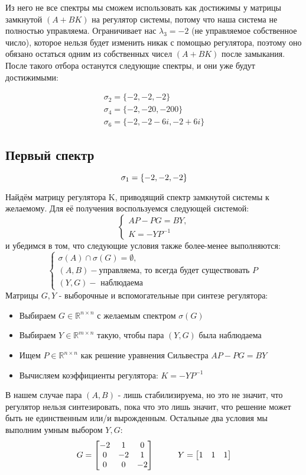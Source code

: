 Из него не все спектры мы сможем использовать как достижимы у матрицы замкнутой $(A+BK)$ на регулятор системы, потому что наша система не полностью управляема.
Ограничивает нас $\lambda_3=-2$ (не управляемое собственное число), которое нельзя будет изменить никак с помощью регулятора, поэтому оно обязано остаться одним из собственных чисел $(A+BK)$ после замыкания.
После такого отбора останутся следующие спектры, и они уже будут достижимыми:

$$
  \begin{aligned}
    \sigma_2 = \{-2, -2, -2\} \\
    \sigma_4 = \{-2, -20, -200\} \\
    \sigma_6 = \{-2, -2-6i, -2+6i\} 
  \end{aligned}
$$

\subsection{Первый спектр}
$$
    \sigma_1 = \{-2, -2, -2\} \\
$$

Найдём матрицу регулятора K, приводящий спектр замкнутой системы к желаемому. Для её получения воспользуемся следующей системой:
$$
\begin{cases}
  AP - PG = BY, \\
  K = -YP^{-1}
\end{cases}
$$ и убедимся в том, что следующие условия также более-менее выполняются:
$$
  \begin{cases}
    \sigma(A) \cap \sigma(G) = \emptyset, \\
    (A,B) - \text{управляема, то всегда будет существовать } P \\
    (Y,G) - \text{ наблюдаема } 
  \end{cases}
$$
Матрицы $G,Y$ - выборочные и вспомогательные при синтезе регулятора:
\begin{itemize}
  \item Выбираем $G\in\mathbb{R}^{n\times n}$ с желаемым спектром $\sigma(G)$
  \item Выбираем $Y\in\mathbb{R}^{m\times n}$ такую, чтобы пара $(Y, G)$ была наблюдаема
  \item Ищем $P\in\mathbb{R}^{n\times n}$ как решение уравнения Сильвестра $AP - PG = BY$
  \item Вычисляем коэффициенты регулятора: $K = -YP^{-1}$
\end{itemize}

В нашем случае пара $(A,B)$ - лишь стабилизируема, но это не значит, что регулятор нельзя синтезировать, пока что это лишь значит, что
решение может быть не единственным или/и вырожденным. Остальные два условия мы выполним умным выбором $Y,G$:
$$
G = \begin{bmatrix}
    -2  &  1  & 0 \\
     0  & -2  & 1 \\
     0  &  0  & -2 
\end{bmatrix} \hspace*{1cm} Y = \begin{bmatrix}
  1 & 1 & 1
\end{bmatrix}
$$


